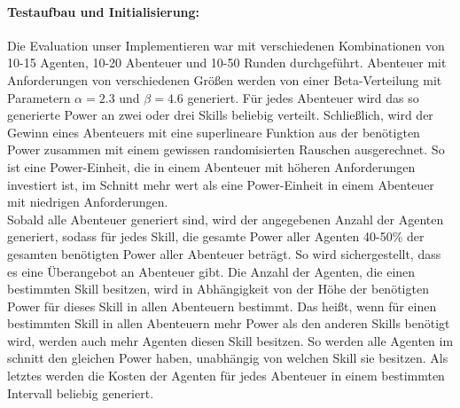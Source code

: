 \documentclass[fleqn,10pt]{SelfArx} %
\begin{document}
\paragraph{Testaufbau und Initialisierung:}
Die Evaluation unser Implementieren war mit verschiedenen Kombinationen von 10-15 Agenten, 10-20 Abenteuer und 10-50 Runden durchgeführt. Abenteuer mit Anforderungen von verschiedenen Größen werden von einer Beta-Verteilung mit Parametern $\alpha=2.3$ und $\beta=4.6$ generiert. Für jedes Abenteuer wird das so generierte Power an zwei oder drei Skills beliebig verteilt. Schließlich, wird der Gewinn eines Abenteuers mit eine superlineare Funktion aus der benötigten Power zusammen mit einem gewissen randomisierten Rauschen ausgerechnet. So ist eine Power-Einheit, die in einem Abenteuer mit höheren Anforderungen investiert ist, im Schnitt mehr wert als eine Power-Einheit in einem Abenteuer mit niedrigen Anforderungen.\\
Sobald alle Abenteuer generiert sind, wird der angegebenen Anzahl der Agenten generiert, sodass für jedes Skill, die gesamte Power aller Agenten 40-50\% der gesamten benötigten Power aller Abenteuer beträgt. So wird sichergestellt, dass es eine Überangebot an Abenteuer gibt. Die Anzahl der Agenten, die einen bestimmten Skill besitzen, wird in Abhängigkeit von der Höhe der benötigten Power für dieses Skill in allen Abenteuern bestimmt. Das heißt, wenn für einen bestimmten Skill in allen Abenteuern mehr Power als den anderen Skills benötigt wird, werden auch mehr Agenten diesen Skill besitzen. So werden alle Agenten im schnitt den gleichen Power haben, unabhängig von welchen Skill sie besitzen. Als letztes werden die Kosten der Agenten für jedes Abenteuer in einem bestimmten Intervall beliebig generiert.
\end{document}
